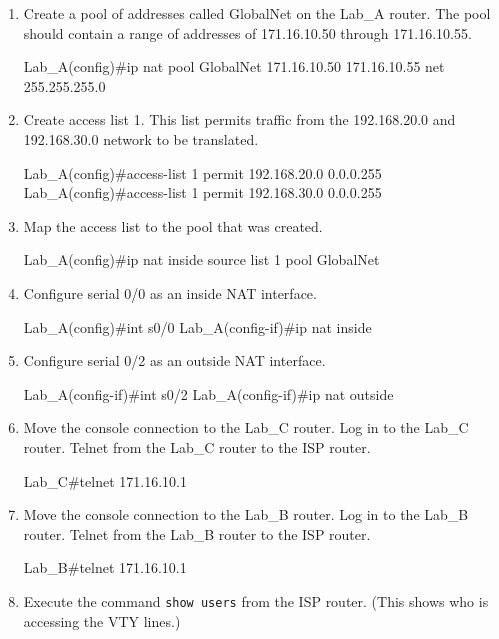 \begin{enumerate}
\item
  Create a pool of addresses called GlobalNet on the Lab\_A router. The
  pool should contain a range of addresses of 171.16.10.50 through
  171.16.10.55.

\begin{cli}
Lab_A(config)#ip nat pool GlobalNet 171.16.10.50 171.16.10.55
net 255.255.255.0
\end{cli}
\item
  Create access list
  1. This list permits traffic from the 192.168.20.0 and 192.168.30.0
  network to be translated.

\begin{cli}
Lab_A(config)#access-list 1 permit 192.168.20.0 0.0.0.255
Lab_A(config)#access-list 1 permit 192.168.30.0 0.0.0.255
\end{cli}
\item
  Map the access list to the pool that was created.

\begin{cli}
Lab_A(config)#ip nat inside source list 1 pool GlobalNet
\end{cli}
\item
  Configure serial 0/0 as an inside NAT interface.

\begin{cli}
Lab_A(config)#int s0/0
Lab_A(config-if)#ip nat inside
\end{cli}
\item
  Configure serial 0/2 as an outside NAT interface.

\begin{cli}
Lab_A(config-if)#int s0/2
Lab_A(config-if)#ip nat outside
\end{cli}
\item
  Move the console connection to the Lab\_C router. Log in to the Lab\_C
  router. Telnet from the Lab\_C router to the ISP router.

\begin{cli}
Lab_C#telnet 171.16.10.1
\end{cli}
\item
  Move the console connection to the Lab\_B router. Log in to the Lab\_B
  router. Telnet from the Lab\_B router to the ISP router.

\begin{cli}
Lab_B#telnet 171.16.10.1
\end{cli}
\item
  Execute the command \texttt{show\ users} from the ISP router. (This
  shows who is accessing the VTY lines.)


\end{enumerate}
